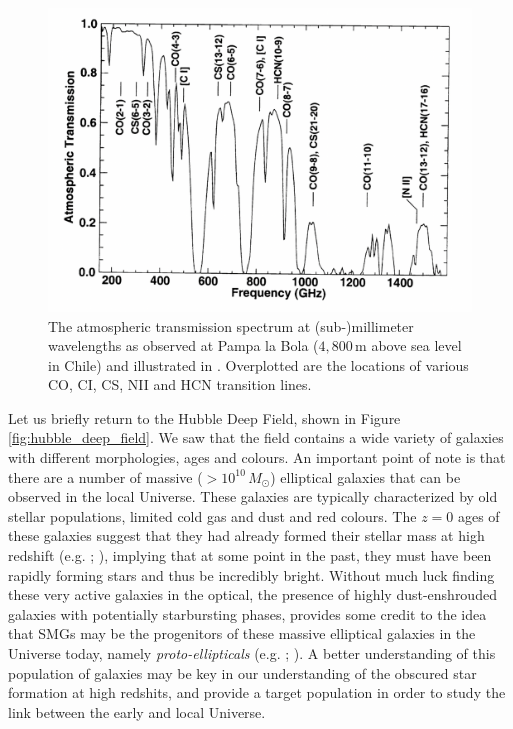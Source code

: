 \begin{figure}
    \centering
	\includegraphics[angle=0.5, width=0.75\columnwidth]{Figures/transmission.pdf}
	\caption{The atmospheric transmission spectrum at (sub-)millimeter wavelengths as observed at Pampa la Bola ($4,800\,$m above sea level in Chile) and illustrated in \citealt{Matsushita_2000}. Overplotted are the locations of various CO, CI, CS, NII and HCN transition lines.}
	\label{fig:transmission}
\end{figure}

Let us briefly return to the Hubble Deep Field, shown in Figure \ref{fig:hubble_deep_field}. We saw that the field contains a wide variety of galaxies with different morphologies, ages and colours. An important point of note is that there are a number of massive ($>10^{10}\,M_\odot$) elliptical galaxies that can be observed in the local Universe. These galaxies are typically characterized by old stellar populations, limited cold gas and dust and red colours. The $z = 0$ ages of these galaxies suggest that they had already formed their stellar mass at high redshift (e.g. \citealt{Gallazzi_2005}; \citealt{Thomas_2005}), implying that at some point in the past, they must have been rapidly forming stars and thus be incredibly bright. Without much luck finding these very active galaxies in the optical, the presence of highly dust-enshrouded galaxies with potentially starbursting phases, provides some credit to the idea that SMGs may be the progenitors of these massive elliptical galaxies in the Universe today, namely \textit{proto-ellipticals} (e.g. \citealt{Toft_2014}; \citealt{Valentino_2020b}). A better understanding of this population of galaxies may be key in our understanding of the obscured star formation at high redshits, and provide a target population in order to study the link between the early and local Universe.

